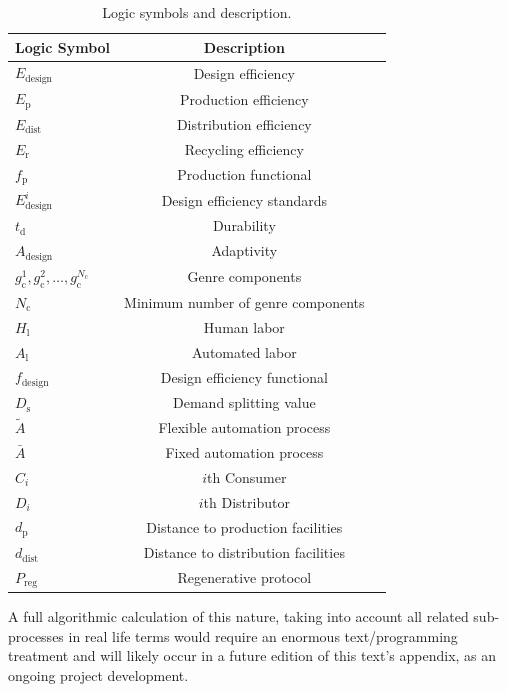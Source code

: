 \documentclass[10pt, a4paper, cleardoubleempty, openright, twoside]{book}
\begin{document}
\begin{table}[h!]
	\begin{center}
  \begin{tabular}{l c c}
\hline
\hline
		Logic Symbol & Description
\\
\hline
$E_\text{design}$ & Design efficiency
\\
$E_\text{p}$ & Production efficiency
\\
$E_\text{dist}$ & Distribution efficiency
\\
$E_\text{r}$ & Recycling efficiency
\\
$f_\text{p}$ & Production functional
\\
$E^i_\text{design}$ & Design efficiency standards
\\
$t_\text{d}$ & Durability
\\
$A_\text{design}$ & Adaptivity
\\
$g^1_\text{c}, g^2_\text{c}, \dots, g^{N_\text{c}}_\text{c}$ & Genre
components
\\
$N_\text{c}$ & Minimum number of genre components
\\
$H_\text{l}$ & Human labor
\\
$A_\text{l}$ & Automated labor
\\
$f_\text{design}$ & Design efficiency functional
\\
$D_\text{s}$ & Demand splitting value
\\
$\tilde{A}$ & Flexible automation process
\\
$\bar{A}$ & Fixed automation process
\\
$C_i$ & $i$th Consumer
\\
$D_i$ & $i$th Distributor
\\
$d_\text{p}$ & Distance to production facilities
\\
$d_\text{dist}$ & Distance to distribution facilities
\\
$P_\text{reg}$ & Regenerative protocol
\\
\hline
\hline
\end{tabular}
\end{center}
 \caption{\label{tab:symbols}Logic symbols and description.}
\end{table}


A full algorithmic calculation of this nature, taking into account all
related sub-processes in real life terms would require an enormous
text/programming treatment and will likely occur in a future edition of
this text's appendix, as an ongoing project development. 
\end{document}
